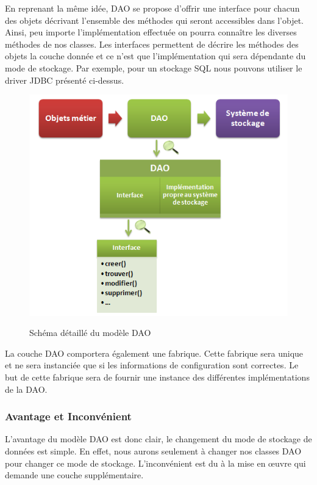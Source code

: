 En reprenant la même idée, DAO se propose d'offrir une interface pour chacun des objets décrivant l'ensemble des méthodes qui seront accessibles dans l'objet. Ainsi, peu importe l'implémentation effectuée on pourra connaître les diverses méthodes de nos classes. Les interfaces permettent de décrire les méthodes des objets la couche donnée et ce n'est que l'implémentation qui sera dépendante du mode de stockage. Par exemple, pour un stockage SQL nous pouvons utiliser le driver JDBC présenté ci-dessus.\\ 
\begin{figure}[!h]
  \center
  \includegraphics[scale=0.5]{../graph/dao2.png} \\
  \caption{Schéma détaillé du modèle DAO}
\end{figure}

La couche DAO comportera également une fabrique. Cette fabrique sera unique et ne sera instanciée que si les informations de configuration sont correctes. Le but de cette fabrique sera de fournir une instance des différentes implémentations de la DAO.

\subsubsection{Avantage et Inconvénient}
L'avantage du modèle DAO est donc clair, le changement du mode de stockage de données est simple. En effet, nous aurons seulement à changer nos classes DAO pour changer ce mode de stockage. L'inconvénient est du à la mise en œuvre qui demande une couche supplémentaire. 



